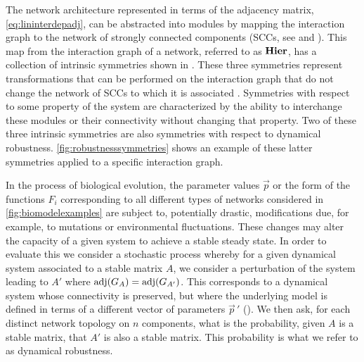 The network architecture represented in terms of the adjacency matrix, \ref{eq:lininterdepadj}, can be abstracted into modules by mapping the interaction graph to the network of strongly connected components (SCCs, see  and ). This map from the interaction graph of a network, referred to as $\mathbf{Hier}$, has a collection of intrinsic symmetries shown in . These three symmetries represent transformations that can be performed on the interaction graph that do not change the network of SCCs to which it is associated . Symmetries with respect to some property of the system are characterized by the ability to interchange these modules or their connectivity without changing that property. Two of these three intrinsic symmetries are also symmetries with respect to dynamical robustness. \ref{fig:robustnesssymmetries} shows an example of these latter symmetries applied to a specific interaction graph.

In the process of biological evolution, the parameter values $\vec{p}$ or the form of the functions $F_i$ corresponding to all different types of networks considered in \ref{fig:biomodelexamples} are subject to, potentially drastic, modifications due, for example, to mutations or environmental fluctuations. These changes may alter the capacity of a given system to achieve a stable steady state. In order to evaluate this we consider a stochastic process whereby for a given dynamical system associated to a stable matrix $A$, we consider a perturbation of the system leading to $A'$ where $\mathrm{adj}(G_A) = \mathrm{adj}(G_{A'})$. This corresponds to a dynamical system whose connectivity is preserved, but where the underlying model is defined in terms of a different vector of parameters ${\vec{p}}\,'$ (). We then ask, for each distinct network topology on $n$ components, what is the probability, given $A$ is a stable matrix, that $A'$ is also a stable matrix. This probability is what we refer to as dynamical robustness.

